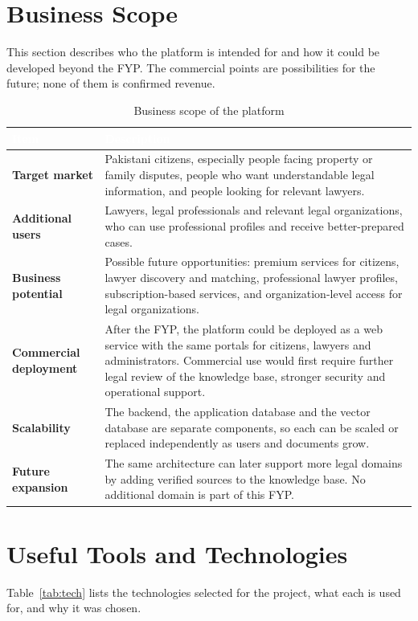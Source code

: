 \documentclass[12pt,a4paper]{report}
\newcommand{\thd}[1]{\textcolor{white}{\textbf{#1}}}
\newcommand{\headrow}{\rowcolor{tablehead}}
\begin{document}
\section{Business Scope}
This section describes who the platform is intended for and how it could be developed beyond the FYP. The commercial points are possibilities for the future; none of them is confirmed revenue.

\begin{table}[H]
\centering
\caption{Business scope of the platform}
\label{tab:business}
\begin{tabular}{|L{3.6cm}|L{10.4cm}|}
\hline
\headrow \thd{Item} & \thd{Description} \\ \hline
\textbf{Target market} & Pakistani citizens, especially people facing property or family disputes, people who want understandable legal information, and people looking for relevant lawyers. \\ \hline
{}\textbf{Additional users} & Lawyers, legal professionals and relevant legal organizations, who can use professional profiles and receive better-prepared cases. \\ \hline
\textbf{Business potential} & Possible future opportunities: premium services for citizens, lawyer discovery and matching, professional lawyer profiles, subscription-based services, and organization-level access for legal organizations. \\ \hline
{}\textbf{Commercial deployment} & After the FYP, the platform could be deployed as a web service with the same portals for citizens, lawyers and administrators. Commercial use would first require further legal review of the knowledge base, stronger security and operational support. \\ \hline
\textbf{Scalability} & The backend, the application database and the vector database are separate components, so each can be scaled or replaced independently as users and documents grow. \\ \hline
{}\textbf{Future expansion} & The same architecture can later support more legal domains by adding verified sources to the knowledge base. No additional domain is part of this FYP. \\ \hline
\end{tabular}
\end{table}

\section{Useful Tools and Technologies}
Table~\ref{tab:tech} lists the technologies selected for the project, what each is used for, and why it was chosen.
\end{document}
